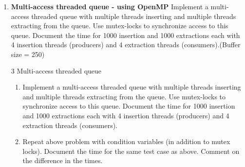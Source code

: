 \documentclass{sem5}
\begin{document}
\begin{enumerate}
\begin{enumerate}
\begin{enumerate}
\end{enumerate}
\end{enumerate}

\item \textbf{Multi-access threaded queue - using OpenMP}
Implement a multi-access threaded queue with multiple threads inserting and multiple threads extracting from the queue. Use mutex-locks to synchronize access to this queue. Document the time for 1000 insertion and 1000 extractions each with 4 insertion threads (producers) and 4 extraction threads (consumers).(Buffer size = 250)
\end{enumerate}

\begin{itemize}
\item[3] Multi-access threaded queue
\begin{enumerate}
\item Implement a multi-access threaded queue with multiple threads inserting and multiple threads extracting from the queue. Use mutex-locks to synchronize access to this queue. Document the time for 1000 insertion and 1000 extractions each with 4 insertion threads (producers) and 4 extraction threads (consumers).

\item Repeat above problem with condition variables (in addition to mutex locks). Document the time for the same test case as above. Comment on the difference in the times.

\end{enumerate}
\end{itemize}
\end{document}
